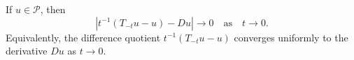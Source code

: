 If $u \in \mathcal{P}$, then
$$|t^{-1}(T_{-t}u - u) - Du| \to 0 \quad \text{as} \quad t \to 0.$$
Equivalently, the difference quotient $t^{-1}(T_{-t}u - u)$ converges uniformly to the derivative $Du$ as $t \to 0$.
